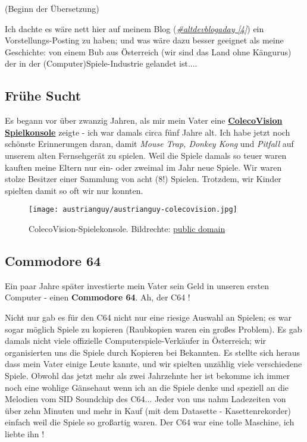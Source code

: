 \documentclass[10pt,a4paper,ngerman,twoside]{article} %
\begin{document}
(Beginn der Übersetzung)

Ich dachte es wäre nett hier auf meinem Blog (\href{http://www.altdevblogaday.com/}{\textit{\#altdevblogaday [4]}}) ein Vorstellungs-Posting zu haben; und was wäre dazu besser geeignet als meine Geschichte: von einem Bub aus Österreich (wir sind das Land ohne Kängurus) der in der (Computer)Spiele-Industrie gelandet ist....

\subsection*{Frühe Sucht}

Es begann vor über zwanzig Jahren, als mir mein Vater eine \href{https://de.wikipedia.org/wiki/Colecovision}{\textbf{ColecoVision Spielkonsole}} 
zeigte - ich war damals circa fünf Jahre alt. Ich habe jetzt noch schönste Erinnerungen daran, damit \textit{Mouse Trap, Donkey Kong} und \textit{Pitfall} auf unserem alten Fernsehgerät zu spielen. Weil die Spiele damals so teuer waren kauften meine Eltern nur ein- oder zweimal im Jahr neue Spiele. Wir waren stolze Besitzer einer Sammlung von acht (8!) Spielen. Trotzdem, wir Kinder spielten damit so oft wir nur konnten.
\begin{figure}
\texttt{[image: austrianguy/austrianguy-colecovision.jpg]}\\
\caption{ColecoVision-Spielekonsole. Bildrechte: \href{https://commons.wikimedia.org/wiki/File:Coleco-vision-console.jpg}{public domain}}
\end{figure}

\subsection*{Commodore 64}

Ein paar Jahre später investierte mein Vater sein Geld in unseren ersten Computer - einen \textbf{Commodore 64}. Ah, der C64 !

Nicht nur gab es für den C64 nicht nur eine riesige Auswahl an Spielen; es war sogar möglich Spiele zu kopieren (Raubkopien waren ein großes Problem). Es gab damals nicht viele offizielle Computerspiele-Verkäufer in Österreich; wir organisierten uns die Spiele durch Kopieren bei Bekannten.  Es stellte sich heraus dass mein Vater einige Leute kannte, und wir spielten unzählig viele verschiedene Spiele. Obwohl das jetzt mehr als zwei Jahrzehnte her ist bekomme ich immer noch eine wohlige Gänsehaut wenn ich an die Spiele denke und speziell an die Melodien vom SID Soundchip des C64...  Jeder von uns nahm Ladezeiten von über zehn Minuten und mehr in Kauf (mit dem Datasette - Kasettenrekorder) einfach weil die Spiele so großartig waren. Der C64 war eine tolle Maschine, ich liebte ihn !
\end{document}
